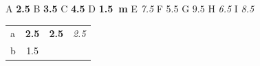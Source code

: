 \documentclass{article}
\begin{document}
A {\bfseries\num{2.5}} B {\bfseries\num[detect-weight]{3.5}} C {\bfseries\num[detect-weight, mode=text]{4.5}}
D \textbf{\SI[detect-weight]{1.5}{m}} E {\sffamily\itshape\num[detect-all]{7.5}} F {\ttfamily\num[detect-weight]{5.5}}
G {\bfseries $\num[detect-weight]{9.5}$} H {\itshape\num[detect-shape]{6.5}} I {\itshape\num[detect-shape, mode=text]{8.5}}

\begin{tabular}{lSS[detect-weight=true, detect-family=true]S[detect-all]}
a & \bfseries 2.5 & \bfseries 2.5 & \itshape 2.5 \\
b & 1.5 &  &  \\
\end{tabular}
\end{document}
